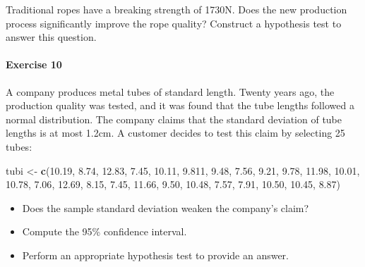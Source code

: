 \documentclass[
]{article}
\newenvironment{Shaded}{\begin{snugshade}}{\end{snugshade}}
\newcommand{\FloatTok}[1]{\textcolor[rgb]{0.00,0.00,0.81}{#1}}
\newcommand{\FunctionTok}[1]{\textcolor[rgb]{0.13,0.29,0.53}{\textbf{#1}}}
\newcommand{\NormalTok}[1]{#1}
\newcommand{\OtherTok}[1]{\textcolor[rgb]{0.56,0.35,0.01}{#1}}
\providecommand{\tightlist}{%
  \setlength{\itemsep}{0pt}\setlength{\parskip}{0pt}}
\begin{document}
Traditional ropes have a breaking strength of 1730N. Does the new
production process significantly improve the rope quality? Construct a
hypothesis test to answer this question.

\hypertarget{exercise-10}{%
\paragraph{Exercise 10}\label{exercise-10}}

A company produces metal tubes of standard length. Twenty years ago, the
production quality was tested, and it was found that the tube lengths
followed a normal distribution. The company claims that the standard
deviation of tube lengths is at most 1.2cm. A customer decides to test
this claim by selecting 25 tubes:

\begin{Shaded}
\begin{Highlighting}[]
\NormalTok{tubi }\OtherTok{\textless{}{-}} \FunctionTok{c}\NormalTok{(}\FloatTok{10.19}\NormalTok{, }\FloatTok{8.74}\NormalTok{, }\FloatTok{12.83}\NormalTok{, }\FloatTok{7.45}\NormalTok{, }\FloatTok{10.11}\NormalTok{, }\FloatTok{9.811}\NormalTok{, }\FloatTok{9.48}\NormalTok{, }\FloatTok{7.56}\NormalTok{, }\FloatTok{9.21}\NormalTok{, }\FloatTok{9.78}\NormalTok{, }\FloatTok{11.98}\NormalTok{, }\FloatTok{10.01}\NormalTok{, }\FloatTok{10.78}\NormalTok{, }\FloatTok{7.06}\NormalTok{, }\FloatTok{12.69}\NormalTok{, }\FloatTok{8.15}\NormalTok{, }\FloatTok{7.45}\NormalTok{, }\FloatTok{11.66}\NormalTok{, }\FloatTok{9.50}\NormalTok{, }\FloatTok{10.48}\NormalTok{, }\FloatTok{7.57}\NormalTok{, }\FloatTok{7.91}\NormalTok{, }\FloatTok{10.50}\NormalTok{, }\FloatTok{10.45}\NormalTok{, }\FloatTok{8.87}\NormalTok{)}
\end{Highlighting}
\end{Shaded}

\begin{itemize}
\tightlist
\item
  Does the sample standard deviation weaken the company's claim?
\item
  Compute the 95\% confidence interval.
\item
  Perform an appropriate hypothesis test to provide an answer.
\end{itemize}
\end{document}
